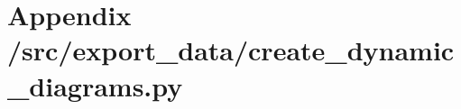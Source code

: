 \section{Appendix /src/export\_data/create\_dynamic\_diagrams.py}\label{app:create_dynamic_diagrams.py}

